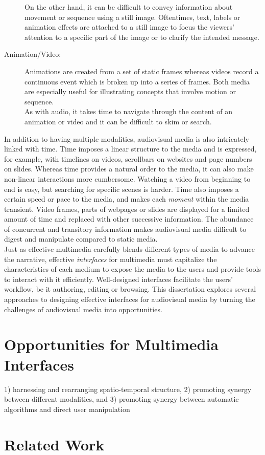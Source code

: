 \begin{description}
On the other hand, it can be difficult to convey information about movement or sequence using a still image. Oftentimes, text, labels or animation effects are attached to a still image to focus the viewers' attention to a specific part of the image or to clarify the intended message.\\
\item[Animation/Video:] Animations are created from a set of static frames whereas videos record a continuous event which is broken up into a series of frames. Both media are especially useful for illustrating concepts that involve motion or sequence.\\
As with audio, it takes time to navigate through the content of an animation or video and it can be difficult to skim or search.
\end{description}

In addition to having multiple modalities, audiovisual media is also intricately linked with time. Time imposes a linear structure to the media and is expressed, for example, with timelines on videos, scrollbars on websites and page numbers on slides. Whereas time provides a natural order to the media, it can also make non-linear interactions more cumbersome. Watching a video from beginning to end is easy, but searching for specific scenes is harder. Time also imposes a certain speed or pace to the media, and makes each \textit{moment}  within the media transient. Video frames, parts of webpages or slides are displayed for a limited amount of time and replaced with other successive information. The abundance of concurrent and transitory information makes audiovisual media difficult to digest and manipulate compared to static media.\\

Just as effective multimedia carefully blends different types of media to advance the narrative, effective \textit{interfaces} for multimedia must capitalize the characteristics of each medium to expose the media to the users and provide tools to interact with it efficiently. Well-designed interfaces facilitate the users' workflow, be it authoring, editing or browsing. This dissertation explores several approaches to designing effective interfaces for audiovisual media by turning the challenges of audiovisual media into opportunities.

\section{Opportunities for Multimedia Interfaces}
1) harnessing and rearranging spatio-temporal structure, 2) promoting synergy between different modalities, and 3) promoting synergy between automatic algorithms and direct user manipulation

\section{Related Work}
